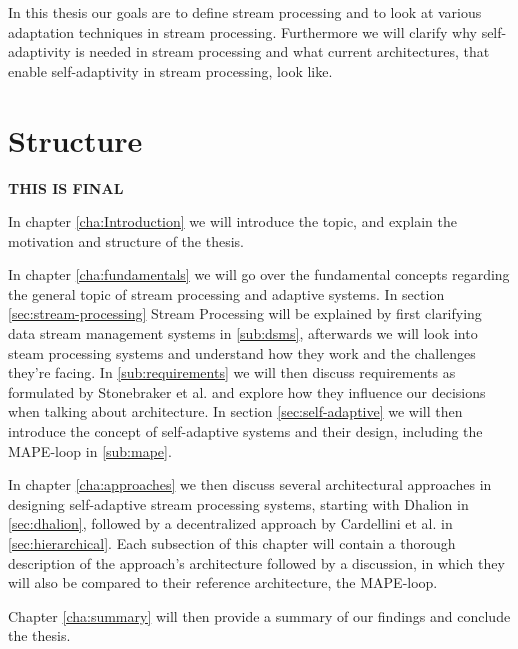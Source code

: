 In this thesis our goals are to define stream processing and to look at various adaptation techniques in stream processing. Furthermore we will clarify why
self-adaptivity is needed in stream processing and what current architectures, that enable self-adaptivity in stream processing, look like.


\section{Structure}
\label{sec:structure}
\textbf{\color{green}THIS IS FINAL}

In chapter \ref{cha:Introduction} we will introduce the topic, and explain the motivation and structure of the thesis.

In chapter \ref{cha:fundamentals} we will go over the fundamental concepts regarding the general topic of stream processing and adaptive systems.
In section \ref{sec:stream-processing} Stream Processing will be explained by first clarifying data stream management systems 
in \ref{sub:dsms}, afterwards we will look into steam processing systems and understand how they work and the challenges they're facing.
In \ref{sub:requirements} we will then discuss requirements as formulated by Stonebraker et al. and explore how they influence our decisions when talking about architecture.
In section \ref{sec:self-adaptive} we will then introduce the concept of self-adaptive systems and their design, including the MAPE-loop in \ref{sub:mape}.

In chapter \ref{cha:approaches} we then discuss several architectural approaches in designing self-adaptive stream processing systems, starting with Dhalion in \ref{sec:dhalion}, 
followed by a decentralized approach by Cardellini et al. in \ref{sec:hierarchical}.
Each subsection of this chapter will contain a thorough description of the approach's architecture followed by a discussion, 
in which they will also be compared to their reference architecture, the MAPE-loop.

Chapter \ref{cha:summary} will then provide a summary of our findings and conclude the thesis.